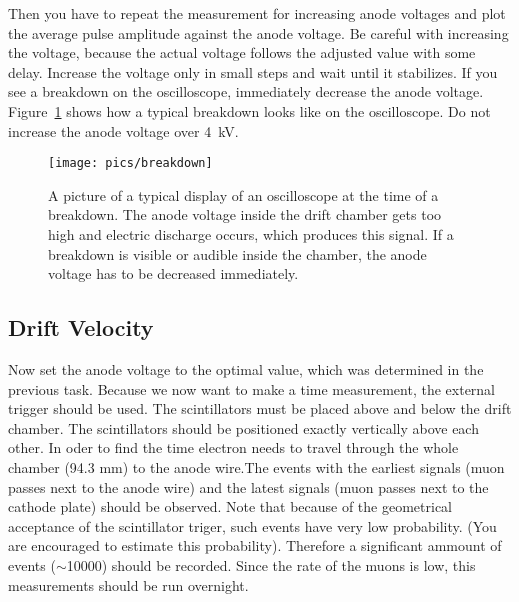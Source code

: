 \documentclass[12pt]{article}
\begin{document}

Then you have to repeat the measurement for increasing anode voltages and plot the average pulse amplitude against the anode voltage. Be careful with increasing the voltage, because the actual voltage follows the adjusted value with some delay. Increase the voltage only in small steps and wait until it stabilizes. If you see a breakdown on the oscilloscope, immediately decrease the anode voltage. Figure~\ref{fig:breakdown} shows how a typical breakdown looks like on the oscilloscope. Do not increase the anode voltage over \SI{4}{\kilo\volt}. 

\begin{figure}[h]
\texttt{[image: pics/breakdown]}
\centering
\caption{A picture of a typical display of an oscilloscope at the time of a breakdown. The anode voltage inside the drift chamber gets too high and electric discharge occurs, which produces this signal. If a breakdown is visible or audible inside the chamber, the anode voltage has to be decreased immediately.}
\label{fig:breakdown}
\end{figure}

\subsection{Drift Velocity}
Now set the anode voltage to the optimal value, which was determined in the previous task. Because we now want to make a time measurement, the external trigger should be used. The scintillators must be placed above and below the drift chamber. The scintillators should be positioned exactly vertically above each other. In oder to find the time electron needs to travel through the whole chamber (94.3 mm) to the anode wire.The events with the earliest signals (muon passes next to the anode wire) and the latest signals (muon passes next to the cathode plate) should be observed. Note that because of the geometrical acceptance of the scintillator triger, such events have very low probability. (You are encouraged to estimate this probability). Therefore a significant ammount of events ($\sim$10000) should be recorded. Since the rate of the muons is low, this measurements should be run overnight.
\end{document}
